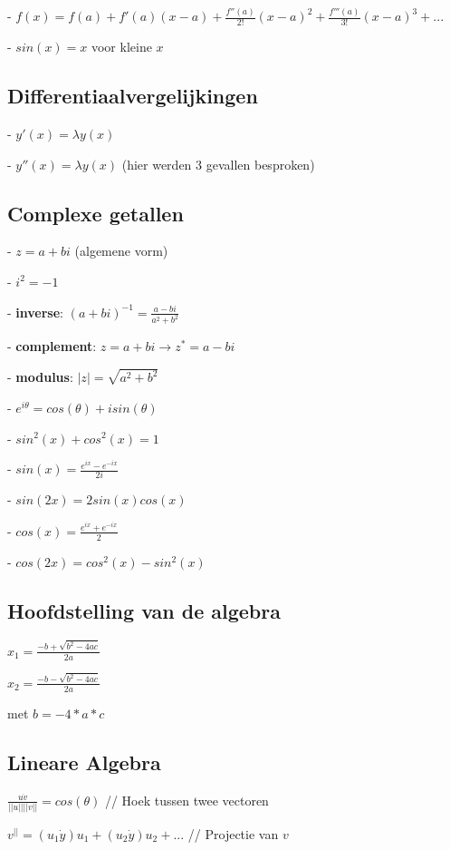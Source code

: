 \documentclass[a4paper]{report}
\begin{document}
- $ f(x) = f(a) + f'(a)(x-a) + \frac{f''(a)}{2!}(x-a)^2 + \frac{f'''(a)}{3!}(x-a)^3 + ... $

- $sin(x) = x$ voor kleine $x$

\subsection*{Differentiaalvergelijkingen}

- $y'(x) = \lambda y(x)$

- $y''(x) = \lambda y(x)$ (hier werden 3 gevallen besproken)

\subsection*{Complexe getallen}

- $z = a + bi$ (algemene vorm)

- $i^2 = -1$

- \textbf{inverse}: $(a + bi)^{-1} = \frac{a - bi}{a^2 + b^2}$

- \textbf{complement}: $z = a + bi \rightarrow z^* = a - bi$

- \textbf{modulus}: $|z| = \sqrt{a^2 + b^2}$

- $e^{i\theta} = cos(\theta) + i sin(\theta)$

- $sin^2(x) + cos^2(x) = 1$

- $sin(x) = \frac{e^{ix} - e^{-ix}}{2i}$

- $sin(2x) = 2sin(x)cos(x)$

- $cos(x) = \frac{e^{ix} + e^{-ix}}{2}$

- $cos(2x) = cos^2(x) - sin^2(x)$

\subsection*{Hoofdstelling van de algebra}

$x_1 = \frac{-b + \sqrt{b^2 - 4ac}}{2a}$

$x_2 = \frac{-b - \sqrt{b^2 - 4ac}}{2a}$

met $b = -4*a*c$

\subsection*{Lineare Algebra}

$\frac{u\dot v}{||u|| ||v||} = cos(\theta)$ // Hoek tussen twee vectoren

$v^{||} = (u_1 \dot y) u_1 + (u_2 \dot y) u_2 + ...$ // Projectie van $v$
\end{document}
